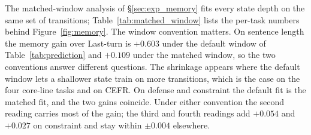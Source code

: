 The matched-window analysis of \S\ref{sec:exp_memory} fits every state depth on the same set of transitions; Table~\ref{tab:matched_window} lists the per-task numbers behind Figure~\ref{fig:memory}.
The window convention matters. On sentence length the memory gain over Last-turn is $+0.603$ under the default window of Table~\ref{tab:prediction} and $+0.109$ under the matched window, so the two conventions answer different questions.  %
The shrinkage appears where the default window lets a shallower state train on more transitions, which is the case on the four core-line tasks and on CEFR.  %
On defense and constraint the default fit is the matched fit, and the two gains coincide.  %
Under either convention the second reading carries most of the gain; the third and fourth readings add $+0.054$ and $+0.027$ on constraint and stay within $\pm 0.004$ elsewhere.  %
